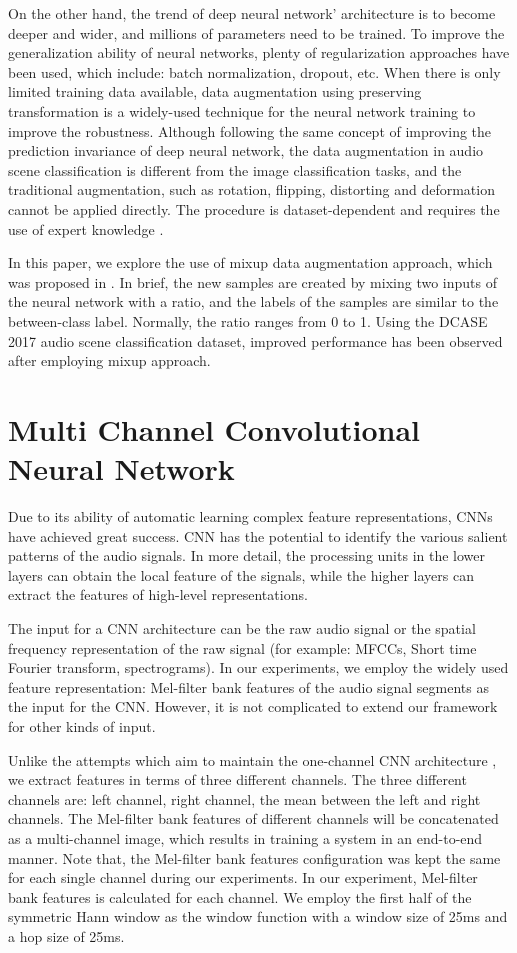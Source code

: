 \documentclass[conference]{IEEEtran}
\begin{document}
On the other hand, the trend of deep neural network' architecture is to become deeper and wider, and millions of parameters need to be trained. To improve the generalization ability of neural networks, plenty of regularization approaches have been used, which include: batch normalization, dropout, etc. When there is only limited training data available, data augmentation using preserving transformation is a widely-used technique for the neural network training to improve the robustness. Although following the same concept of improving the prediction invariance of deep neural network, the data augmentation in audio scene classification is different from the image classification tasks, and the traditional augmentation, such as rotation, flipping, distorting and deformation cannot be applied directly. The procedure is dataset-dependent and requires the use of expert knowledge \cite{b6}.

In this paper, we explore the use of mixup data augmentation approach, which was proposed in \cite{b6}. In brief, the new samples are created by mixing two inputs of the neural network with a ratio, and the labels of the samples are similar to the between-class label. Normally, the ratio ranges from 0 to 1. Using the DCASE 2017 audio scene classification dataset, improved performance has been observed after employing mixup approach.

\section{Multi Channel Convolutional Neural Network}
Due to its ability of automatic learning complex feature representations, CNNs have achieved great success. CNN has the potential to identify the various salient patterns of the audio signals. In more detail, the processing units in the lower layers can obtain the local feature of the signals, while the higher layers can extract the features of high-level representations.

The input for a CNN architecture can be the raw audio signal or the spatial frequency representation of the raw signal (for example: MFCCs, Short time Fourier transform, spectrograms). In our experiments, we employ the widely used feature representation: Mel-filter bank features of the audio signal segments as the input for the CNN. However, it is not complicated to extend our framework for other kinds of input.

Unlike the attempts which aim to maintain the one-channel CNN architecture \cite{b11}, we extract features in terms of three different channels. The three different channels are: left channel, right channel, the mean between the left and right channels. The Mel-filter bank features of different channels will be concatenated as a multi-channel image, which results in training a system in an end-to-end manner. Note that, the Mel-filter bank features configuration was kept the same for each single channel during our experiments. In our experiment, Mel-filter bank features is calculated for each channel. We employ the first half of the symmetric Hann window as the window function with a window size of 25ms and a hop size of 25ms.
\end{document}

